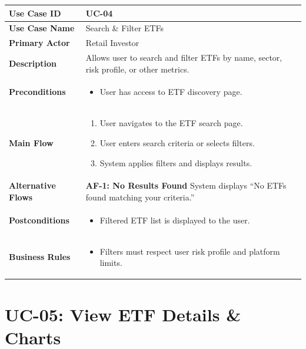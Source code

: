 \begin{longtable}{|>{\raggedright\arraybackslash\bfseries}p{3.5cm}|p{11cm}|}
\hline
\rowcolor{gray!15} Use Case ID & UC-04 \\ \hline
Use Case Name & Search \& Filter ETFs \\ \hline
Primary Actor & Retail Investor \\ \hline
Description & Allows user to search and filter ETFs by name, sector, risk profile, or other metrics. \\ \hline
Preconditions &
\begin{itemize}[leftmargin=*, nosep]
    \item User has access to ETF discovery page.
\end{itemize} \\ \hline
Main Flow &
\begin{enumerate}[leftmargin=*, nosep]
    \item User navigates to the ETF search page.
    \item User enters search criteria or selects filters.
    \item System applies filters and displays results.
\end{enumerate} \\ \hline
Alternative Flows &
\textbf{AF-1: No Results Found} \newline
System displays “No ETFs found matching your criteria.” \\ \hline
Postconditions &
\begin{itemize}[leftmargin=*, nosep]
    \item Filtered ETF list is displayed to the user.
\end{itemize} \\ \hline
Business Rules &
\begin{itemize}[leftmargin=*, nosep]
    \item Filters must respect user risk profile and platform limits.
\end{itemize} \\ \hline
\end{longtable}

\section{UC-05: View ETF Details \& Charts}
\label{uc:view-etf}

